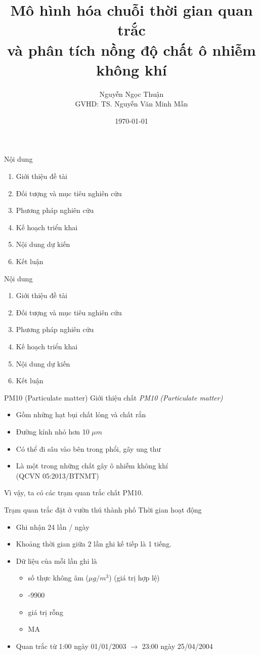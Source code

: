\documentclass{beamer}
\title[Chuỗi thời gian PM10]{Mô hình hóa chuỗi thời gian quan trắc\\và phân tích nồng độ chất ô nhiễm không khí} %
\author[Nguyễn Ngọc Thuận]{Nguyễn Ngọc Thuận\\GVHD: TS. Nguyễn Văn Minh Mẫn} %
\institute[] %
{
Đại học Bách Khoa, TP.HCM \\ %
}
\date{\today} %
\begin{document}
	
\begin{frame}
\titlepage 
\end{frame}

\begin{frame}{Nội dung}
\begin{enumerate}
\item Giới thiệu đề tài
\item Đối tượng và mục tiêu nghiên cứu
\item Phương pháp nghiên cứu
\item Kế hoạch triển khai
\item Nội dung dự kiến
\item Kết luận
\end{enumerate}
\end{frame}

\begin{frame}{Nội dung}
\begin{enumerate}
\item {\color{red}Giới thiệu đề tài}
\item Đối tượng và mục tiêu nghiên cứu
\item Phương pháp nghiên cứu
\item Kế hoạch triển khai
\item Nội dung dự kiến
\item Kết luận
\end{enumerate}
\end{frame}

\begin{frame}{PM10 (Particulate matter)}
Giới thiệu chất \textit{PM10 (Particulate matter)}
\begin{itemize}
\item Gồm những hạt bụi chất lỏng và chất rắn
\item Đường kính nhỏ hơn 10 \(\mu m\)
\item Có thể đi sâu vào bên trong phổi, gây ung thư
\item Là một trong những chất gây ô nhiễm không khí\\
 (QCVN 05:2013/BTNMT)
\end{itemize}
Vì vậy, ta có các trạm quan trắc chất PM10.
\end{frame}

\begin{frame}{Trạm quan trắc đặt ở vườn thú thành phố}
Thời gian hoạt động
\begin{itemize}
\item Ghi nhận 24 lần / ngày
\item Khoảng thời gian giữa 2 lần ghi kế tiếp là 1 tiếng.
\item Dữ liệu của mỗi lần ghi là
\begin{itemize}
\item {\color{blue}số thực không âm (\(\mu g / m^3\)) (giá trị hợp lệ)}
\item {\color{red}-9900}
\item {\color{red}giá trị rỗng}
\item {\color{red}MA}
\end{itemize}
\item Quan trắc từ 1:00 ngày 01/01/2003 \(\to\) 23:00 ngày 25/04/2004
\end{itemize}
\end{frame}
\end{document}
